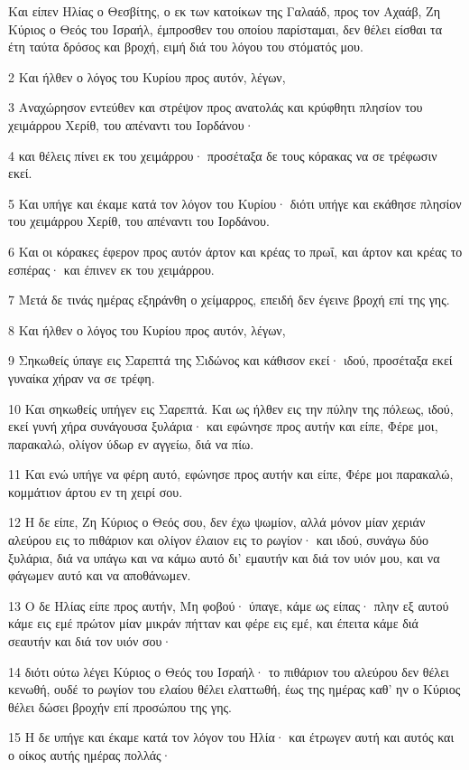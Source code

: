 \par Και είπεν Ηλίας ο Θεσβίτης, ο εκ των κατοίκων της Γαλαάδ, προς τον Αχαάβ, Ζη Κύριος ο Θεός του Ισραήλ, έμπροσθεν του οποίου παρίσταμαι, δεν θέλει είσθαι τα έτη ταύτα δρόσος και βροχή, ειμή διά του λόγου του στόματός μου.
\par 2 Και ήλθεν ο λόγος του Κυρίου προς αυτόν, λέγων,
\par 3 Αναχώρησον εντεύθεν και στρέψον προς ανατολάς και κρύφθητι πλησίον του χειμάρρου Χερίθ, του απέναντι του Ιορδάνου·
\par 4 και θέλεις πίνει εκ του χειμάρρου· προσέταξα δε τους κόρακας να σε τρέφωσιν εκεί.
\par 5 Και υπήγε και έκαμε κατά τον λόγον του Κυρίου· διότι υπήγε και εκάθησε πλησίον του χειμάρρου Χερίθ, του απέναντι του Ιορδάνου.
\par 6 Και οι κόρακες έφερον προς αυτόν άρτον και κρέας το πρωΐ, και άρτον και κρέας το εσπέρας· και έπινεν εκ του χειμάρρου.
\par 7 Μετά δε τινάς ημέρας εξηράνθη ο χείμαρρος, επειδή δεν έγεινε βροχή επί της γης.
\par 8 Και ήλθεν ο λόγος του Κυρίου προς αυτόν, λέγων,
\par 9 Σηκωθείς ύπαγε εις Σαρεπτά της Σιδώνος και κάθισον εκεί· ιδού, προσέταξα εκεί γυναίκα χήραν να σε τρέφη.
\par 10 Και σηκωθείς υπήγεν εις Σαρεπτά. Και ως ήλθεν εις την πύλην της πόλεως, ιδού, εκεί γυνή χήρα συνάγουσα ξυλάρια· και εφώνησε προς αυτήν και είπε, Φέρε μοι, παρακαλώ, ολίγον ύδωρ εν αγγείω, διά να πίω.
\par 11 Και ενώ υπήγε να φέρη αυτό, εφώνησε προς αυτήν και είπε, Φέρε μοι παρακαλώ, κομμάτιον άρτου εν τη χειρί σου.
\par 12 Η δε είπε, Ζη Κύριος ο Θεός σου, δεν έχω ψωμίον, αλλά μόνον μίαν χεριάν αλεύρου εις το πιθάριον και ολίγον έλαιον εις το ρωγίον· και ιδού, συνάγω δύο ξυλάρια, διά να υπάγω και να κάμω αυτό δι' εμαυτήν και διά τον υιόν μου, και να φάγωμεν αυτό και να αποθάνωμεν.
\par 13 Ο δε Ηλίας είπε προς αυτήν, Μη φοβού· ύπαγε, κάμε ως είπας· πλην εξ αυτού κάμε εις εμέ πρώτον μίαν μικράν πήτταν και φέρε εις εμέ, και έπειτα κάμε διά σεαυτήν και διά τον υιόν σου·
\par 14 διότι ούτω λέγει Κύριος ο Θεός του Ισραήλ· το πιθάριον του αλεύρου δεν θέλει κενωθή, ουδέ το ρωγίον του ελαίου θέλει ελαττωθή, έως της ημέρας καθ' ην ο Κύριος θέλει δώσει βροχήν επί προσώπου της γης.
\par 15 Η δε υπήγε και έκαμε κατά τον λόγον του Ηλία· και έτρωγεν αυτή και αυτός και ο οίκος αυτής ημέρας πολλάς·
